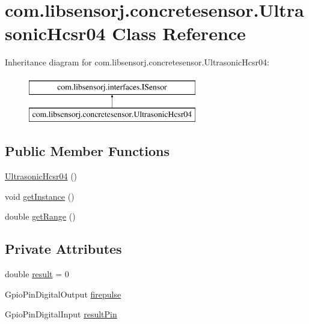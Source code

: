 \hypertarget{classcom_1_1libsensorj_1_1concretesensor_1_1UltrasonicHcsr04}{}\section{com.\+libsensorj.\+concretesensor.\+Ultrasonic\+Hcsr04 Class Reference}
\label{classcom_1_1libsensorj_1_1concretesensor_1_1UltrasonicHcsr04}
Inheritance diagram for com.\+libsensorj.\+concretesensor.\+Ultrasonic\+Hcsr04\+:\begin{figure}[H]
\begin{center}
\leavevmode
\includegraphics[height=2.000000cm]{classcom_1_1libsensorj_1_1concretesensor_1_1UltrasonicHcsr04}
\end{center}
\end{figure}
\subsection*{Public Member Functions}
\begin{DoxyCompactItemize}
\item 
\hyperlink{classcom_1_1libsensorj_1_1concretesensor_1_1UltrasonicHcsr04_a7e02068d9acb1b3cf1d15d45afbf377b}{Ultrasonic\+Hcsr04} ()
\item 
void \hyperlink{classcom_1_1libsensorj_1_1concretesensor_1_1UltrasonicHcsr04_a170167614b330d79518647a9a9722b62}{get\+Instance} ()
\item 
double \hyperlink{classcom_1_1libsensorj_1_1concretesensor_1_1UltrasonicHcsr04_aec68f4aadd8faa618025dfa37c89c696}{get\+Range} ()
\end{DoxyCompactItemize}
\subsection*{Private Attributes}
\begin{DoxyCompactItemize}
\item 
double \hyperlink{classcom_1_1libsensorj_1_1concretesensor_1_1UltrasonicHcsr04_aad32f417f9106fa8f3f2e2a7416f033b}{result} = 0
\item 
Gpio\+Pin\+Digital\+Output \hyperlink{classcom_1_1libsensorj_1_1concretesensor_1_1UltrasonicHcsr04_a3ee094cf624224f6ba5d945f444148a5}{firepulse}
\item 
Gpio\+Pin\+Digital\+Input \hyperlink{classcom_1_1libsensorj_1_1concretesensor_1_1UltrasonicHcsr04_ae9065bb5c2cdf04f273996ffbb2b75af}{result\+Pin}
\end{DoxyCompactItemize}
